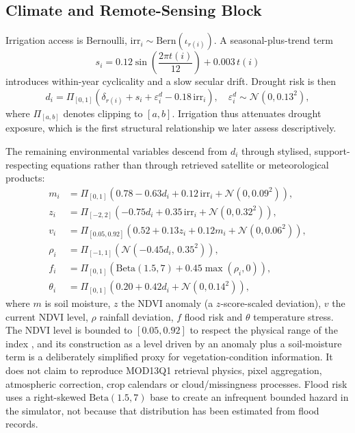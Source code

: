 \documentclass[journal]{IEEEtran}
\begin{document}
\subsection{Climate and Remote-Sensing Block}
Irrigation access is Bernoulli, $\text{irr}_i\sim\text{Bern}(\iota_{r(i)})$. A seasonal-plus-trend term
\begin{equation}
s_i = 0.12\sin\!\left(\frac{2\pi t(i)}{12}\right) + 0.003\,t(i)
\label{eq:season}
\end{equation}
introduces within-year cyclicality and a slow secular drift. Drought risk is then
\begin{equation}
d_i = \Pi_{[0,1]}\!\left(\delta_{r(i)} + s_i + \varepsilon^d_i - 0.18\,\text{irr}_i\right),\quad \varepsilon^d_i\sim\mathcal{N}(0,0.13^2),
\label{eq:drought}
\end{equation}
where $\Pi_{[a,b]}$ denotes clipping to $[a,b]$. Irrigation thus attenuates drought exposure, which is the first structural relationship we later assess descriptively.

The remaining environmental variables descend from $d_i$ through stylised, support-respecting equations rather than through retrieved satellite or meteorological products:
\begin{align}
m_i &= \Pi_{[0,1]}\!\left(0.78 - 0.63 d_i + 0.12\,\text{irr}_i + \mathcal{N}(0,0.09^2)\right), \label{eq:sm}\\
z_i &= \Pi_{[-2,2]}\!\left(-0.75 d_i + 0.35\,\text{irr}_i + \mathcal{N}(0,0.32^2)\right), \label{eq:ndvianom}\\
v_i &= \Pi_{[0.05,0.92]}\!\left(0.52 + 0.13 z_i + 0.12 m_i + \mathcal{N}(0,0.06^2)\right), \label{eq:ndvi}\\
\rho_i &= \Pi_{[-1,1]}\!\left(\mathcal{N}(-0.45 d_i,\,0.35^2)\right), \label{eq:rain}\\
f_i &= \Pi_{[0,1]}\!\left(\text{Beta}(1.5,7) + 0.45\max(\rho_i,0)\right), \label{eq:flood}\\
\theta_i &= \Pi_{[0,1]}\!\left(0.20 + 0.42 d_i + \mathcal{N}(0,0.14^2)\right), \label{eq:temp}
\end{align}
where $m$ is soil moisture, $z$ the NDVI anomaly (a $z$-score-scaled deviation), $v$ the current NDVI level, $\rho$ rainfall deviation, $f$ flood risk and $\theta$ temperature stress. The NDVI level is bounded to $[0.05,0.92]$ to respect the physical range of the index \cite{tucker1979ndvi}, and its construction as a level driven by an anomaly plus a soil-moisture term is a deliberately simplified proxy for vegetation-condition information. It does not claim to reproduce MOD13Q1 retrieval physics, pixel aggregation, atmospheric correction, crop calendars or cloud/missingness processes. Flood risk uses a right-skewed $\text{Beta}(1.5,7)$ base to create an infrequent bounded hazard in the simulator, not because that distribution has been estimated from flood records.
\end{document}
